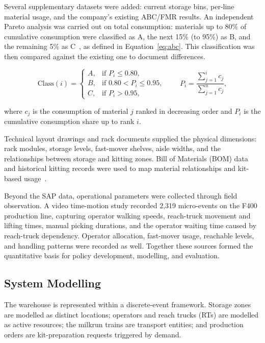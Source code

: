 \documentclass[12pt,a4paper]{article}
\begin{document}
Several supplementary datasets were added: current storage bins, per-line
material usage, and the company's existing ABC/FMR results. An independent
Pareto analysis was carried out on total consumption: materials up to 80\% of
cumulative consumption were classified as A, the next 15\% (to 95\%) as B, and
the remaining 5\% as C~\cite{flores1986,law2015}, as defined in
Equation~\eqref{eq:abc}. This classification was then compared against the
existing one to document differences.

\begin{equation}
\label{eq:abc}
\mathrm{Class}(i)=
\begin{cases}
A, & \text{if } P_i \le 0.80,\\[2pt]
B, & \text{if } 0.80 < P_i \le 0.95,\\[2pt]
C, & \text{if } P_i > 0.95,
\end{cases}
\qquad
P_i=\frac{\sum_{j=1}^{i} c_j}{\sum_{j=1}^{n} c_j},
\end{equation}

\noindent where $c_j$ is the consumption of material $j$ ranked in decreasing
order and $P_i$ is the cumulative consumption share up to rank $i$.

Technical layout drawings and rack documents supplied the physical
dimensions: rack modules, storage levels, fast-mover shelves, aisle widths,
and the relationships between storage and kitting zones. Bill of Materials
(BOM) data and historical kitting records were used to map material
relationships and kit-based usage~\cite{bartholdi2014}.

Beyond the SAP data, operational parameters were collected through field
observation. A video time-motion study recorded 2{,}319 micro-events on the
F400 production line, capturing operator walking speeds, reach-truck movement
and lifting times, manual picking durations, and the operator waiting time
caused by reach-truck dependency. Operator allocation, fast-mover usage,
reachable levels, and handling patterns were recorded as well. Together these
sources formed the quantitative basis for policy development, modelling, and
evaluation.

\subsection{System Modelling}
The warehouse is represented within a discrete-event framework. Storage zones
are modelled as distinct locations; operators and reach trucks (RTs) are
modelled as active resources; the milkrun trains are transport entities; and
production orders are kit-preparation requests triggered by demand.
\end{document}
